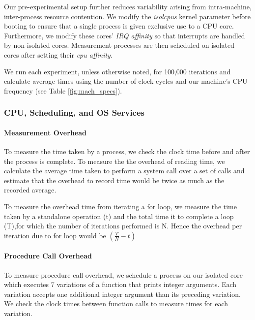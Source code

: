 \documentclass{article}
\begin{document}
Our pre-experimental setup further reduces variability arising from intra-machine, inter-process resource 
contention. We modify the \textit{isolcpus} kernel parameter before booting to ensure that a single process 
is given exclusive use to a CPU core. Furthermore, we modify these cores' \textit{IRQ affinity} so that 
interrupts are handled by non-isolated cores. Measurement processes are then scheduled on isolated cores 
after setting their \textit{cpu affinity}.

We run each experiment, unless otherwise noted, for 100,000 iterations and calculate average times using 
the number of clock-cycles and our machine's CPU frequency (see Table \ref{fig:mach_specs}). 


\subsubsection{CPU, Scheduling, and OS Services}

\paragraph{Measurement Overhead}

To measure the time taken by a process, we check the clock time before and after the process is complete.
To measure the the overhead of reading time, we calculate the average time taken to perform a system call over
a set of calls and estimate that the overhead to record time would be twice as much as the recorded average.

To measure the overhead time from iterating a for loop, we measure the time taken by a standalone 
operation (t) and the total time it to complete a loop (T),for which the number of iterations performed is N. 
Hence the overhead per iteration due to for loop would be $(\frac{T}{N} - t)$ 

\paragraph{Procedure Call Overhead}

To measure procedure call overhead, we schedule a process on our isolated core which executes 7 variations of a function that
prints integer arguments. Each variation accepts one additional integer argument than its preceding variation. We check the 
clock times between function calls to measure times for each variation.
\end{document}
